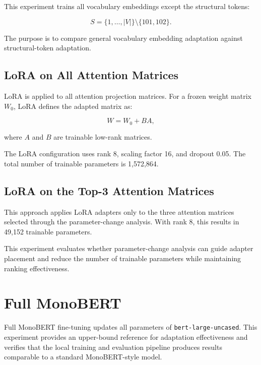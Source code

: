 This experiment trains all vocabulary embeddings except the structural tokens:

\begin{equation}
    S =
    \{1,\ldots,|V|\}
    \setminus
    \{101,102\}.
\end{equation}

The purpose is to compare general vocabulary embedding adaptation against structural-token adaptation.

\subsection{LoRA on All Attention Matrices}
\label{subsec:methodology_lora_all}

LoRA is applied to all attention projection matrices. For a frozen weight matrix $W_0$, LoRA defines the adapted matrix as:

\begin{equation}
    W = W_0 + BA,
\end{equation}

where $A$ and $B$ are trainable low-rank matrices.

The LoRA configuration uses rank 8, scaling factor 16, and dropout 0.05. The total number of trainable parameters is 1,572,864.

\subsection{LoRA on the Top-3 Attention Matrices}
\label{subsec:methodology_lora_top3}

This approach applies LoRA adapters only to the three attention matrices selected through the parameter-change analysis. With rank 8, this results in 49,152 trainable parameters.

This experiment evaluates whether parameter-change analysis can guide adapter placement and reduce the number of trainable parameters while maintaining ranking effectiveness.

\section{Full MonoBERT}
\label{subsec:methodology_full_monobert}

Full MonoBERT fine-tuning updates all parameters of \texttt{bert-large-uncased}. This experiment provides an upper-bound reference for adaptation effectiveness and verifies that the local training and evaluation pipeline produces results comparable to a standard MonoBERT-style model.

